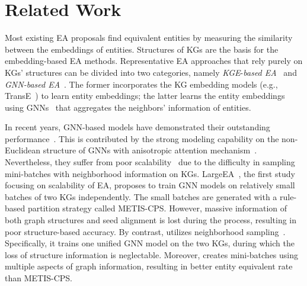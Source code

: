 \vspace*{-2mm}
\section{Related Work}
\label{sec:related_work}

Most existing EA proposals find equivalent entities by measuring the similarity between the embeddings of entities. Structures of KGs are the basis for the embedding-based EA methods.
Representative EA approaches that rely purely on KGs' structures can be divided into two categories, namely \emph{KGE}-\emph{based EA}~\cite{MTransE17, IPTransE17, BootEA18, TransEdge19} and \emph{GNN-based EA}~\cite{GCN-Align18, KECG19, MRAEA20, AliNet20, HyperKA20, MuGNN19}.
The former incorporates the KG embedding models (e.g., TransE~\cite{TransE13}) to learn entity embeddings; the latter
learns the entity embeddings using GNNs~\cite{GCN17} that aggregates the neighbors' information of entities.

In recent years, GNN-based models have demonstrated their outstanding performance~\cite{DualAMN21}. This is contributed by the strong modeling capability on the non-Euclidean structure of GNNs with anisotropic attention mechanism~\cite{GAT18}. Nevertheless, they suffer from poor scalability~\cite{LargeEA22} due to the difficulty in sampling mini-batches with neighborhood information on KGs. LargeEA~\cite{LargeEA22}, the first study focusing on scalability of EA, proposes to train GNN models on relatively small batches of two KGs independently.
The small batches are generated with a rule-based partition strategy called METIS-CPS.
However, massive information of both graph structures and seed alignment is lost during the process, resulting in poor structure-based accuracy. By contrast, \ClusterEA{} utilizes neighborhood sampling~\cite{GraphSAGE17}. Specifically, it trains one unified GNN model on the two KGs, during which the loss of structure information is neglectable.  
Moreover, \ClusterEA{} creates mini-batches using multiple aspects of graph information, resulting in better entity equivalent rate than METIS-CPS.

